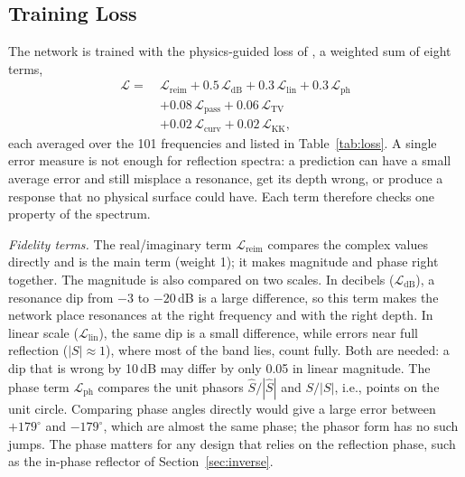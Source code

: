 \documentclass[journal]{IEEEtran}
\newcommand{\Sc}{\hat{S}}
\newcommand{\Lloss}[1]{\mathcal{L}_{\mathrm{#1}}}
\begin{document}
\subsection{Training Loss}
The network is trained with the physics-guided loss of \cite{edgeaware}, a weighted sum of eight terms,
\begin{align}
\mathcal{L} = \ &\Lloss{reim} + 0.5\,\Lloss{dB} + 0.3\,\Lloss{lin} + 0.3\,\Lloss{ph} \nonumber\\
&+ 0.08\,\Lloss{pass} + 0.06\,\Lloss{TV} \nonumber\\
&+ 0.02\,\Lloss{curv} + 0.02\,\Lloss{KK},
\label{eq:total}
\end{align}
each averaged over the 101 frequencies and listed in Table~\ref{tab:loss}. A single error measure is not enough for reflection spectra: a prediction can have a small average error and still misplace a resonance, get its depth wrong, or produce a response that no physical surface could have. Each term therefore checks one property of the spectrum.

\emph{Fidelity terms.} The real/imaginary term $\Lloss{reim}$ compares the complex values directly and is the main term (weight 1); it makes magnitude and phase right together. The magnitude is also compared on two scales. In decibels ($\Lloss{dB}$), a resonance dip from $-3$ to $-20$\,dB is a large difference, so this term makes the network place resonances at the right frequency and with the right depth. In linear scale ($\Lloss{lin}$), the same dip is a small difference, while errors near full reflection ($|S|\approx1$), where most of the band lies, count fully. Both are needed: a dip that is wrong by 10\,dB may differ by only 0.05 in linear magnitude. The phase term $\Lloss{ph}$ compares the unit phasors $\Sc/|\Sc|$ and $S/|S|$, i.e., points on the unit circle. Comparing phase angles directly would give a large error between $+179^\circ$ and $-179^\circ$, which are almost the same phase; the phasor form has no such jumps. The phase matters for any design that relies on the reflection phase, such as the in-phase reflector of Section~\ref{sec:inverse}.
\end{document}
